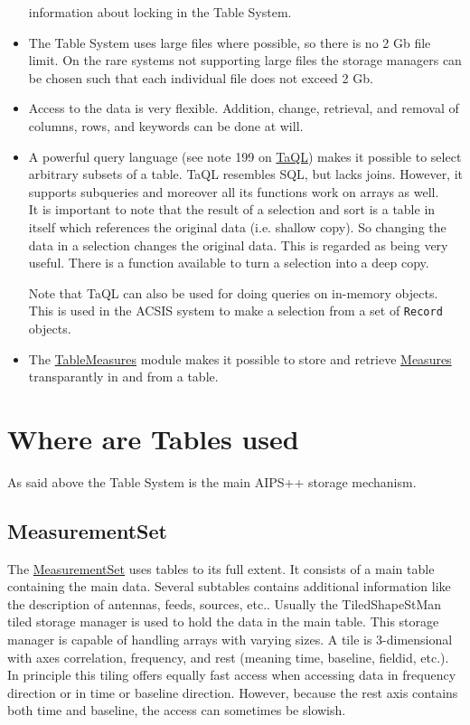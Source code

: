 \begin{itemize}
information about locking in the Table System.
\item The Table System uses large files where possible, so there is
no 2 Gb file limit. On the rare systems not supporting large files
the storage managers can be chosen such that each individual file does
not exceed 2 Gb.
\item
Access to the data is very flexible.
Addition, change, retrieval, and removal of columns, rows, and
keywords can be done at will. 
\item
A powerful query language (see note 199 on
\href{199.html}{TaQL}) makes it possible to
select arbitrary subsets of a table. TaQL resembles SQL, but lacks joins.
However, it supports subqueries and moreover all its functions
work on arrays as well.
\\It is important to note that the result of a selection and sort is a table
in itself which references the original data (i.e. shallow copy).
So changing the data in a
selection changes the original data. This is regarded as being very useful.
There is a function available to turn a selection into a deep copy.

Note that TaQL can also be used for doing queries on in-memory objects.
This is used in the ACSIS system to make a selection from a set of
\texttt{Record} objects.

\item
The \href{../html/group__TableMeasures__module.html}{TableMeasures}
module makes it possible to store and retrieve
\href{../html/group__Measures__module.html}{Measures}
transparantly in and from a table.
\end{itemize}

\section{Where are Tables used}
As said above the Table System is the main AIPS++ storage mechanism.
\subsection{MeasurementSet}
The \href{229.html}{MeasurementSet} uses tables to
its full extent. It consists of a main table containing the main data.
Several subtables contains additional information like the description
of antennas, feeds, sources, etc..
Usually the TiledShapeStMan tiled storage manager is used to hold the
data in the main table. This storage manager is capable of handling
arrays with varying sizes. A tile is 3-dimensional with axes 
correlation, frequency, and rest (meaning time, baseline, fieldid,
etc.). In principle this tiling offers equally fast access when
accessing data in frequency direction or in time or baseline
direction. However, because the rest axis contains both time and
baseline, the access can sometimes be slowish.

